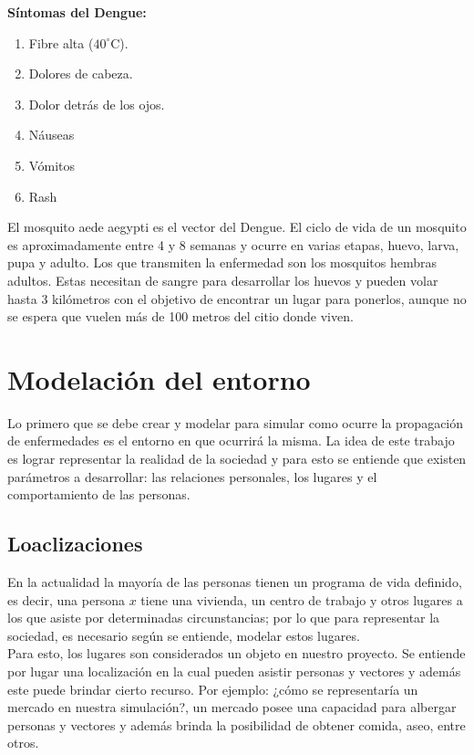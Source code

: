 \textbf{Síntomas del Dengue:}\autocite{OMS2023}
\begin{enumerate}
    \item Fibre alta ($40^{\circ}$C).
    \item Dolores de cabeza.
    \item Dolor detrás de los ojos.
    \item Náuseas
    \item Vómitos
    \item Rash
\end{enumerate}

El mosquito aede aegypti es el vector del Dengue. El ciclo de vida de un mosquito es aproximadamente entre 4 y 
8 semanas y ocurre en varias etapas, huevo, larva, pupa y adulto. Los que transmiten la enfermedad son los mosquitos
hembras adultos. Estas necesitan de sangre para desarrollar los huevos y pueden volar hasta 3 kilómetros con 
el objetivo de encontrar un lugar para ponerlos, aunque no se espera que vuelen más de 100 metros del citio 
donde viven.\\

\section{Modelación del entorno}
Lo primero que se debe crear y modelar para simular como ocurre la propagación de enfermedades es el 
entorno en que ocurrirá la misma. La idea de este trabajo es lograr representar la realidad de la sociedad
y para esto se entiende que existen parámetros a desarrollar: las relaciones personales, los lugares y el comportamiento
de las personas.\\

\subsection{Loaclizaciones}
En la actualidad la mayoría de las personas tienen un programa de vida definido, es decir, una persona $x$ tiene una 
vivienda, un centro de trabajo y otros lugares a los que asiste por determinadas circunstancias; por lo que
para representar la sociedad, es necesario según se entiende, modelar estos lugares.\\

Para esto, los lugares son considerados un objeto en nuestro proyecto. Se entiende por lugar una localización en
la cual pueden asistir personas y vectores y además este puede brindar cierto recurso. Por ejemplo: ¿cómo se
representaría un mercado en nuestra simulación?, un mercado posee una capacidad para albergar personas y vectores 
y además brinda la posibilidad de obtener comida, aseo, entre otros.\\

